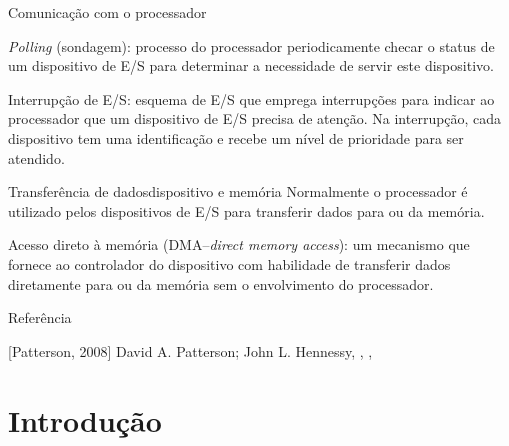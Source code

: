 \begin{frame}{Comunicação com o processador}

  { \alert{\emph{Polling} (sondagem):}
    processo do processador periodicamente checar o status de um dispositivo de
    E/S para determinar a necessidade de servir este dispositivo.    
  }  
  \pause\bigskip

  {
    \alert{Interrupção de E/S:} esquema de E/S que emprega interrupções para
    indicar ao processador que um dispositivo de E/S precisa de atenção.
    Na interrupção, cada dispositivo tem uma identificação e recebe um nível
    de prioridade para ser atendido.
  }  
\end{frame}

\begin{frame}{Transferência de dados}{dispositivo e memória}
  { Normalmente o processador é utilizado pelos
    dispositivos de E/S para transferir dados para ou da memória.
  }
  \pause\bigskip
  
  {
    \alert{Acesso direto à memória (DMA--\emph{direct memory access}):}
    um mecanismo que fornece ao controlador do dispositivo com habilidade
    de transferir dados diretamente para ou da memória sem o envolvimento
    do processador.
  }
  
\end{frame}

\begin{frame}{Referência}{}
\begin{thebibliography}{3}
[Patterson, 2008]
  {David A. Patterson; John L. Hennessy},
  ,
  ,
\end{thebibliography}
\end{frame}


\lecturetitle{\insertlecture}{\course}

\frame{\titlepage}

\section{Introdução}


